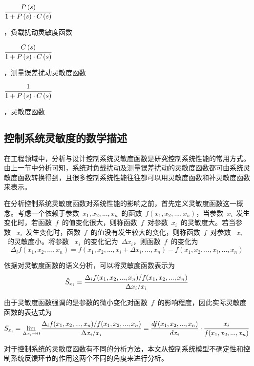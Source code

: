  \medskip
 \begin{small}$\displaystyle\frac{P\left(s\right)}{1+P\left(s\right)\cdot C\left(s\right)}$\end{small}，负载扰动灵敏度函数

 \medskip
 \begin{small}$\displaystyle\frac{C\left(s\right)}{1+P\left(s\right)\cdot C\left(s\right)}$\end{small}，测量误差扰动灵敏度函数

  \medskip
 \begin{small}$\displaystyle\frac{1}{1+P\left(s\right)\cdot C\left(s\right)}$\end{small}，灵敏度函数
 \subsection{控制系统灵敏度的数学描述}
 在工程领域中，分析与设计控制系统灵敏度函数是研究控制系统性能的常用方式。由上一节中分析可知，系统对负载扰动及测量误差扰动的灵敏度函数都可由系统灵敏度函数转换得到，且很多控制系统性能往往都可以用灵敏度函数和补灵敏度函数来表示。

 在分析控制系统灵敏度函数对系统性能的影响之前，首先定义灵敏度函数这一概念。考虑一个依赖于参数~$x_1,x_2,...,x_n$~的函数~$f(x_1,x_2,...,x_n)$，当参数~$x_i$~发生变化时，若函数~$f$~的值变化很大，则称函数~$f$~对参数~$x_i$~的灵敏度大。若当参数~ $x_i$~发生变化时，函数~$f$~的值没有发生较大的变化，则称函数~$f$~对参数~ $x_i$~的灵敏度小。将参数~ $x_i$~的变化记为~$\Delta x_i$，则函数~$f$~的变化为
 \begin{equation}\label{equ:chap3:Index3}
  \Delta_i f\left(x_1,x_2,...,x_n\right)=f\left(x_1,x_2,...,x_i+\Delta x_i,...,x_n\right)-f\left(x_1,x_2,...,x_i,...,x_n\right)
\end{equation}

依据对灵敏度函数的语义分析，可以将灵敏度函数表示为
 \begin{equation}\label{equ:chap3:Index4}
\hat{S}_{x_i}=\displaystyle\frac{\Delta_i f(x_1,x_2,...,x_n)/f(x_1,x_2,...,x_n)}{\Delta x_i/x_i}
\end{equation}

由于灵敏度函数强调的是参数的微小变化对函数~$f$~的影响程度，因此实际灵敏度函数的表达式为
\begin{equation}\label{equ:chap3:Index5}
   S_{x_i}=\lim_{\Delta x_i \to 0}\displaystyle\frac{\Delta_i f(x_1,x_2,...,x_n)/f(x_1,x_2,...,x_n)}{\Delta x_i/x_i}=\displaystyle\frac{df(x_1,x_2,...,x_n)}{dx_i}\cdot \displaystyle\frac{x_i}{f(x_1,x_2,...,x_n)}
\end{equation}

对于控制系统的灵敏度函数有不同的分析方法，本文从控制系统模型不确定性和控制系统反馈环节的作用这两个不同的角度来进行分析。

